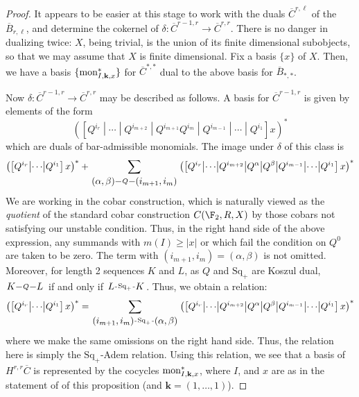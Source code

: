\documentclass[10pt]{article}
\makeatletter
\newcommand{\produces}[3]{{#1}{#3}{#2}}
\renewcommand{\Q}{Q}
\newcommand{\SqShift}{\Sq_{+}}
\newcommand{\Sq}{\mathrm{Sq}}
\newcommand{\DyerLashov}{R}
\newcommand{\minDim}{m}
\newcommand{\BarMonomial}[3]{\textup{mon}_{#1,#2,#3}}
\renewcommand{\produces}[3]{
{
\def\labelstyle{\scriptstyle}
\xymatrix@C=2em@1{
{#1}
\ar@{-}[r]|-{{\,#3\,}}
&%
{#2}%
}}}
\makeatother
\begin{document}
\begin{KoszulComplexes2plus}
\begin{proof}
It appears to be easier at this stage to work with the duals $\overline{C}^{r,\ell}$ of the $\overline{B}_{r,\ell}$, and determine the cokernel of $\delta:\overline{C}^{r-1,r}\to\overline{C}^{r,r}$. There is no danger in dualizing twice: $X$, being trivial, is the union of its finite dimensional subobjects, so that we may assume that $X$ is finite dimensional. Fix a basis $\{x\}$ of $X$. %
Then, we have a basis $\{\BarMonomial{I}{\textbf{k}}{x}^*\}$ for $\overline{C}^{*,*}$ dual to the above basis for $\overline{B}_{*,*}$.

Now $\delta:\overline{C}^{r-1,r}\to\overline{C}^{r,r}$ may be described as follows. A basis for $\overline{C}^{r-1,r}$ is given by elements of the form
\[\left(\left[\Q^{i_r}\middle|\cdots\middle|\Q^{i_{m+2}}  \middle|\Q^{i_{m+1}}\Q^{i_m}\middle|\Q^{i_{m-1}}\middle|\cdots \middle|\Q^{i_1} \right]x\right)^*\]
which are duals of bar-admissible monomials. The image under $\delta$ of this class is
\[
\left(\left[\Q^{i_r}\middle|\cdots \middle|\Q^{i_1} \right]x\right)^*
+
\sum_{\produces{(\alpha,\beta)}{(i_{m+1},i_m)}{\Q}}\left(\left[\Q^{i_r}\middle|\cdots\middle|\Q^{i_{m+2}}  \middle|\Q^{\alpha}\middle|\Q^{\beta}\middle|\Q^{i_{m-1}}\middle|\cdots \middle|\Q^{i_1} \right]x\right)^*\]
We are working in the cobar construction, which is naturally viewed as the \emph{quotient} of the standard cobar construction $C(\F_2,\DyerLashov,X)$ by those cobars not satisfying our unstable condition. Thus, in the right hand side of the above expression, any summands with $\minDim(I)\geq|x|$ or which fail the condition on $\Q^0$ are taken to be zero.
%
The term with $(i_{m+1},i_m)=(\alpha,\beta)$ is not omitted. Moreover, for length 2 sequences $K$ and $L$, as $\Q$ and $\SqShift$ are Koszul dual, $\produces{K}{L}{\Q}$ if and only if $\produces{L}{K}{\SqShift}$. Thus, we obtain a relation:
\[\left(\left[\Q^{i_r}\middle|\cdots \middle|\Q^{i_1} \right]x\right)^*
=
\sum_{\produces{(i_{m+1},i_m)}{(\alpha,\beta)}{\SqShift}}\left(\left[\Q^{i_r}\middle|\cdots\middle|\Q^{i_{m+2}}  \middle|\Q^{\alpha}\middle|\Q^{\beta}\middle|\Q^{i_{m-1}}\middle|\cdots \middle|\Q^{i_1} \right]x\right)^*\]
where we make the same omissions on the right hand side. Thus, the relation here is simply the $\SqShift$-Adem relation.
Using this relation, we see that a basis of $H^{r,r}\overline{C}$ is represented by the cocycles $\BarMonomial{I}{\textbf{k}}{x}^*$, where $I$, and $x$ are as in the statement of of this proposition (and $\textbf{k}=(1,\ldots,1)$).


\end{proof}
\end{KoszulComplexes2plus}
\end{document}
